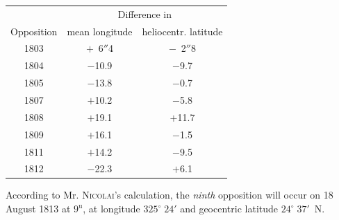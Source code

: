\begin{center}
\fontsize{10}{12}\selectfont\setlength{\tabcolsep}{7pt}\renewcommand{\arraystretch}{1.15}\begin{tabular}{c|c|c}
 & \multicolumn{2}{c}{Difference in} \\
Opposition & mean longitude & heliocentr. latitude \\
\hline
1803 & $+$\ 6$''$4  & $-$\ 2$''$8 \\
1804 & $-$10.9 & $-$9.7 \\
1805 & $-$13.8 & $-$0.7 \\
1807 & $+$10.2 & $-$5.8 \\
1808 & $+$19.1 & $+$11.7 \\
1809 & $+$16.1 & $-$1.5 \\
1811 & $+$14.2 & $-$9.5 \\
1812 & $-$22.3 & $+$6.1 \\
\end{tabular}
\end{center}

\par\indent According to Mr. \textsc{Nicolai}’s calculation, the \emph{ninth} opposition will occur on 18 August 1813 at $9^{\mathrm u}$, at longitude $325^\circ\;24'$ and geocentric latitude $24^\circ\;37'$~N.
